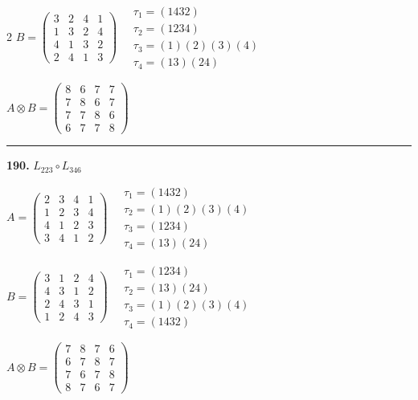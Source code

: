 \begin{multicols}{2}
$B = \begin{pmatrix} 3 & 2 & 4 & 1 \\ 1 & 3 & 2 & 4 \\ 4 & 1 & 3 & 2 \\ 2 & 4 & 1 & 3 \end{pmatrix} \quad \begin{matrix} \tau_{1}=(1 4 3 2) \\ \tau_{2}=(1 2 3 4) \\ \tau_{3}=(1)(2)(3)(4) \\ \tau_{4}=(1 3)(2 4) \end{matrix}$

$A \otimes B = \begin{pmatrix} 8 & 6 & 7 & 7 \\ 7 & 8 & 6 & 7 \\ 7 & 7 & 8 & 6 \\ 6 & 7 & 7 & 8 \end{pmatrix}$

\vspace{0.3em}
\hrule
\vspace{0.3em}

\noindent\textbf{190.} $L_{223} \circ L_{346}$

$A = \begin{pmatrix} 2 & 3 & 4 & 1 \\ 1 & 2 & 3 & 4 \\ 4 & 1 & 2 & 3 \\ 3 & 4 & 1 & 2 \end{pmatrix} \quad \begin{matrix} \tau_{1}=(1 4 3 2) \\ \tau_{2}=(1)(2)(3)(4) \\ \tau_{3}=(1 2 3 4) \\ \tau_{4}=(1 3)(2 4) \end{matrix}$

$B = \begin{pmatrix} 3 & 1 & 2 & 4 \\ 4 & 3 & 1 & 2 \\ 2 & 4 & 3 & 1 \\ 1 & 2 & 4 & 3 \end{pmatrix} \quad \begin{matrix} \tau_{1}=(1 2 3 4) \\ \tau_{2}=(1 3)(2 4) \\ \tau_{3}=(1)(2)(3)(4) \\ \tau_{4}=(1 4 3 2) \end{matrix}$

$A \otimes B = \begin{pmatrix} 7 & 8 & 7 & 6 \\ 6 & 7 & 8 & 7 \\ 7 & 6 & 7 & 8 \\ 8 & 7 & 6 & 7 \end{pmatrix}$


\end{multicols}
